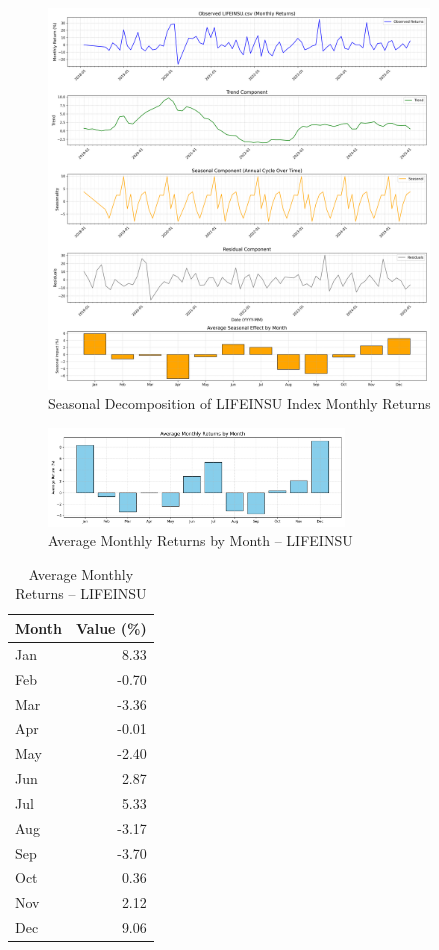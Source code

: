 \documentclass[12pt]{article}
\begin{document}
\begin{figure}[h!]
    \centering
    \includegraphics[width=0.9\textwidth]{decomposition_outputs/LIFEINSU_seasonal_decomposition.png}
    \caption{Seasonal Decomposition of LIFEINSU Index Monthly Returns}
\end{figure}

\begin{figure}[h!]
    \centering
    \includegraphics[width=0.7\textwidth]{decomposition_outputs/LIFEINSU_avg_monthly_returns.png}
    \caption{Average Monthly Returns by Month -- LIFEINSU}
\end{figure}

\begin{table}[h!]
\centering
\caption{Average Monthly Returns -- LIFEINSU}
\begin{tabular}{l r}
\toprule
Month & Value (\%) \\
\midrule
Jan & 8.33 \\
Feb & -0.70 \\
Mar & -3.36 \\
Apr & -0.01 \\
May & -2.40 \\
Jun & 2.87 \\
Jul & 5.33 \\
Aug & -3.17 \\
Sep & -3.70 \\
Oct & 0.36 \\
Nov & 2.12 \\
Dec & 9.06 \\
\bottomrule
\end{tabular}
\end{table}
\end{document}
